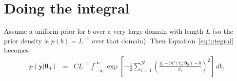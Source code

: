 \documentclass[a4paper, 11pt]{article}
\newcommand{\yy}{\boldsymbol{y}}	%
\newcommand{\btheta}{\boldsymbol{\theta}}  %
\begin{document}
\section{Doing the integral}
Assume a uniform prior for $b$ over a very large domain with length
$L$ (so the prior density is $p(b) = L^{-1}$ over that domain). Then
Equation~\ref{eq:integral} becomes
\begin{eqnarray}
p(\yy | \btheta_0) &=& CL^{-1}\int_{-\infty}^\infty
\exp\left[
-\frac{1}{2}\sum_{i=1}^N
\left(\frac{y_i - m'(t_i; \btheta_0) - b}{\sigma_i}
\right)^2
\right]
\, db.
\end{eqnarray}
\end{document}
